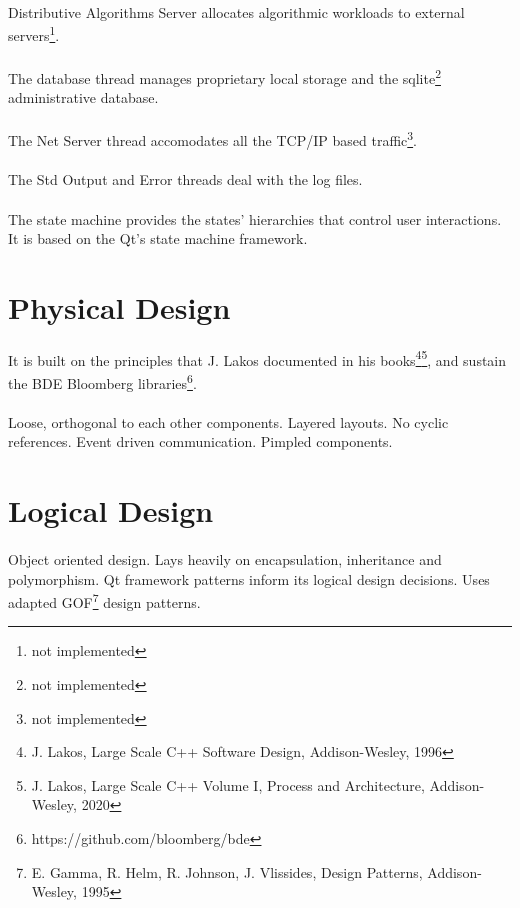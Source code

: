\paragraph{}
Distributive Algorithms Server allocates algorithmic workloads to external servers\footnote{not implemented}.
\paragraph{}
The database thread manages proprietary local storage and the sqlite\footnote{not implemented} administrative database.
\paragraph{}
The Net Server thread accomodates all the TCP/IP based traffic\footnote{not implemented}.
\paragraph{}
The Std Output and Error threads deal with the log files.
\paragraph{}
The state machine provides the states' hierarchies that control user interactions. It is based on the Qt's state machine framework.
\section{Physical Design}
\paragraph{}
It is built on the principles that J. Lakos documented in his books\footnote{J. Lakos, Large Scale C++ Software Design, Addison-Wesley, 1996}\footnote{J. Lakos, Large Scale C++ Volume I, Process and Architecture, Addison-Wesley, 2020}, and sustain the BDE Bloomberg libraries\footnote{https://github.com/bloomberg/bde}. 
\paragraph{}
Loose, orthogonal to each other components. Layered layouts. No cyclic references. Event driven communication. Pimpled components.
\section{Logical Design}
\paragraph{}
Object oriented design. Lays heavily on encapsulation, inheritance and polymorphism. Qt framework patterns inform its logical design decisions. Uses adapted GOF\footnote{E. Gamma, R. Helm, R. Johnson, J. Vlissides, Design Patterns, Addison-Wesley, 1995} design patterns.
